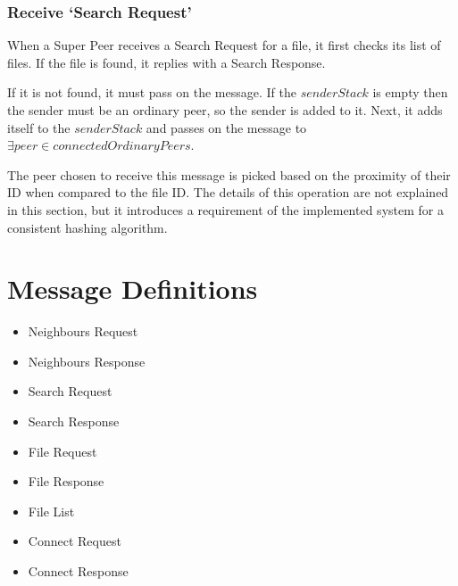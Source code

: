 \subsubsection{Receive `Search Request'}


When a Super Peer receives a Search Request for a file, it first checks its list
of files. If the file is found, it replies with a Search Response. 

If it is not found, it must pass on the message. If the $senderStack$ is empty
then the sender must be an ordinary peer, so the sender is added to it.  Next,
it adds itself to the $senderStack$ and passes on the message to $\exists peer
\in connectedOrdinaryPeers$.

The peer chosen to receive this message is picked based on the proximity of
their ID when compared to the file ID.  The details of this operation are not
explained in this section, but it introduces a requirement of the implemented
system for a consistent hashing algorithm.

\begin{algorithm}[H]


\end{algorithm}

\section{Message Definitions}

\begin{itemize}
  \item{Neighbours Request}
  \item{Neighbours Response}
  \item{Search Request}
  \item{Search Response}
  \item{File Request}
  \item{File Response}
  \item{File List}
  \item{Connect Request}
  \item{Connect Response}
\end{itemize}








